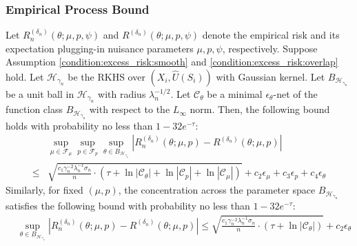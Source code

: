 \subsubsection{Empirical Process Bound}
\begin{lemma}\label{lemma:empirical_loss_deviation} Let
$R_n^{({\delta_n})}(\theta;\mu,p,\psi)$ and $R^{({\delta_n})}(\theta;\mu,p,\psi)$
denote the empirical risk and its expectation plugging-in nuisance parameters $\mu,p,\psi$, respectively. Suppose Assumption \ref{condition:excess_risk:smooth} and \ref{condition:excess_risk:overlap} hold. Let $\mathcal{H}_{\gamma_n}$ be the RKHS over $(X_i,\widehat{U}(S_i))$ with Gaussian kernel. Let $B_{\mathcal{H}_{\gamma_n}}$ be a unit ball in $\mathcal{H}_{\gamma_n}$ with radius $\lambda_n^{-1/2}$. Let $\mathcal{C}_\theta$ be a minimal $\epsilon_\theta$-net of the function class $B_{\mathcal{H}_{\gamma_n}}$ with respect to the $L_\infty$ norm. Then, the following bound holds with probability no less than $1 - 32e^{-\tau}$:
\begin{align*}
&\sup_{\mu\in\mathcal{F}_\mu}\sup_{p\in\mathcal{F}_p}\sup_{\theta\in B_{\mathcal{H}_{\gamma_n}}}\left| R_n^{({\delta_n})}(\theta;\mu,p) - R^{({\delta_n})}(\theta;\mu,p)\right|\\
    \leq &\sqrt{\frac{ c_1\gamma_n^{-2}\lambda_n^{-1}\sigma_n}{n}\cdot\left(\tau +\ln|\mathcal{C}_\theta|+\ln|\mathcal{C}_p|+\ln|\mathcal{C}_\mu|\right)} + c_2\epsilon_\mu + c_3\epsilon_p + c_4\epsilon_\theta
\end{align*}
Similarly, for fixed $(\mu, p)$, the concentration across the parameter space $B_{\mathcal{H}_{\gamma_n}}$ satisfies the following bound with probability no less than $1 - 32e^{-\tau}$:
\begin{align*}
&\sup_{\theta\in B_{\mathcal{H}_{\gamma_n}}}\left| R_n^{({\delta_n})}(\theta;\mu,p) - R^{({\delta_n})}(\theta;\mu,p)\right|
    \leq \sqrt{\frac{ c_1\gamma_n^{-2}\lambda_n^{-1}\sigma_n}{n}\cdot\left(\tau +\ln|\mathcal{C}_\theta|\right)} + c_2\epsilon_\theta   
\end{align*}
\end{lemma}

